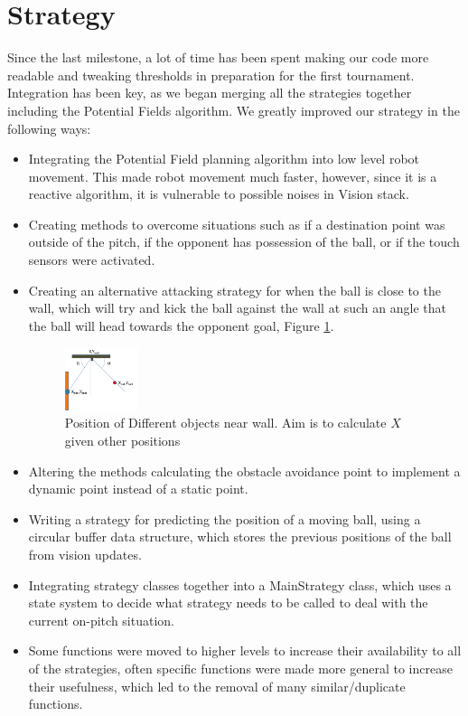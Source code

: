 \documentclass[conference,12pt]{IEEEtran}
\begin{document}
\section{Strategy}
Since the last milestone, a lot of time has been spent making our code more readable and tweaking thresholds in preparation for the first tournament. Integration has been key, as we  began merging all the strategies together including the Potential Fields algorithm. 
We greatly improved our strategy in the following ways:
\begin{itemize}
\item Integrating the Potential Field planning algorithm into low level robot movement. This made robot movement much faster, however, since it is a reactive algorithm, it is vulnerable to possible noises in Vision stack.
\item Creating methods to overcome situations such as if a destination point was outside of the pitch, if the opponent has possession of the ball, or if the touch sensors were activated.
\item Creating an alternative attacking strategy for when the ball is close to the wall, which will try and kick the ball against the wall at such an angle that the ball will head towards the  opponent goal, Figure \ref{fig:bounceWall}.
\begin{figure}[htp]
\begin{center}
\leavevmode
\includegraphics[width=0.2\textwidth] {getBallWall.png}
\end{center}
\caption{Position of Different objects near wall. Aim is to calculate $X$ given other positions}
\label{fig:bounceWall}
\end{figure}
\item Altering the methods calculating the obstacle avoidance point to implement a dynamic point instead of a static point.
\item Writing a strategy for predicting the position of a moving ball, using a circular buffer data structure, which stores the previous positions of the ball from vision updates.
\item Integrating strategy classes together into a MainStrategy class, which uses a state system to decide what strategy needs to be called to deal with the current on-pitch situation.
\item Some functions were moved to higher levels to increase their availability to all of the strategies, often specific functions were made more general to increase their usefulness, which led to the removal of many similar/duplicate functions.
\end{itemize}
\end{document}
